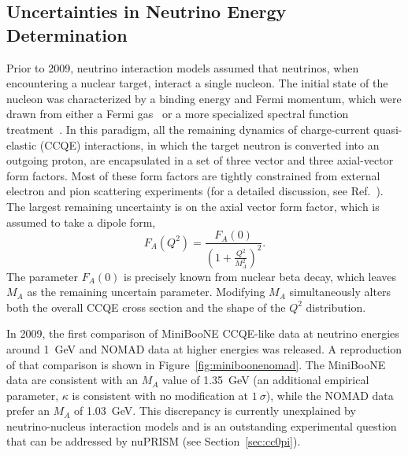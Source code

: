 \subsection{\label{sec:enu_determine}Uncertainties in Neutrino Energy Determination}

Prior to 2009, neutrino interaction models assumed that neutrinos, when encountering a nuclear target, interact a single nucleon. The initial state of the nucleon was characterized by a binding energy and Fermi momentum, which were drawn from either a Fermi gas~\cite{LlewellynSmith:1971zm,Smith:1972xh} or a more specialized spectral function treatment~\cite{Benhar:1989aw}. In this paradigm, all the remaining dynamics of charge-current quasi-elastic (CCQE) interactions, in which the target neutron is converted into an outgoing proton, are encapsulated in a set of three vector and three axial-vector form factors. Most of these form factors are tightly constrained from external electron and pion scattering experiments (for a detailed discussion, see Ref.~\cite{nue-numu-cross-section}). The largest remaining uncertainty is on the axial vector form factor, which is assumed to take a dipole form,
\begin{equation}
F_A(Q^2)=\frac{F_A(0)}{(1+\frac{Q^2}{M_A^2})^2}.
\end{equation}
The parameter $F_A(0)$ is precisely known from nuclear beta decay, which leaves $M_A$ as the remaining uncertain parameter. Modifying $M_A$ simultaneously alters both the overall CCQE cross section and the shape of the $Q^2$ distribution.

In 2009, the first comparison of MiniBooNE CCQE-like data at neutrino energies around 1~GeV and NOMAD data at higher energies was released. A reproduction of that comparison 
is shown in Figure~\ref{fig:miniboonenomad}. The MiniBooNE data are consistent with an $M_A$ value of 1.35~GeV (an additional empirical parameter, $\kappa$ is consistent with no modification at $1~\sigma$), while the NOMAD data prefer an $M_A$ of 1.03~GeV. 
This discrepancy is currently unexplained by neutrino-nucleus interaction models and is an outstanding experimental question that can be addressed by nuPRISM (see Section~\ref{sec:cc0pi}).

